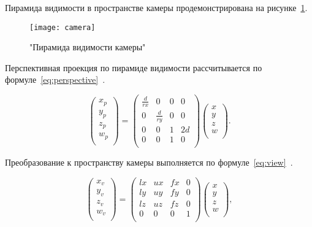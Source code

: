 Пирамида видимости в пространстве камеры продемонстрирована на рисунке~\ref{fig:camera}.

\begin{figure}[H]
	\centering
	\texttt{[image: camera]}
	\caption{"Пирамида видимости камеры"}
	\label{fig:camera}
\end{figure}

Перспективная проекция по пирамиде видимости рассчитывается по формуле~\ref{eq:perspective}~\cite{projection}.

\begin{equation}
	\label{eq:perspective}
	\begin{pmatrix}
		x_p \\
		y_p \\
		z_p \\
		w_p \\
	\end{pmatrix} = 
	\begin{pmatrix}
		\frac{d}{rx}  & 0 & 0 & 0 \\
		0 & \frac{d}{ry} & 0 & 0 \\
		0 & 0 & 1 & 2d \\
		0 & 0 & 1 & 0 \\
	\end{pmatrix}
	\begin{pmatrix}
		x \\
		y \\
		z \\
		w \\
	\end{pmatrix}.
\end{equation}

Преобразование к пространству камеры выполняется по формуле~\ref{eq:view}~\cite{view}.

\begin{equation}
	\label{eq:view}
	\begin{pmatrix}
		x_v \\
		y_v \\
		z_v \\
		w_v \\
	\end{pmatrix} = 
	\begin{pmatrix}
		lx & ux & fx & 0 \\
		ly & uy & fy & 0 \\
		lz & uz & fz & 0 \\
		0 & 0 & 0 & 1 \\
	\end{pmatrix}
	\begin{pmatrix}
		x \\
		y \\
		z \\
		w \\
	\end{pmatrix},
\end{equation}

